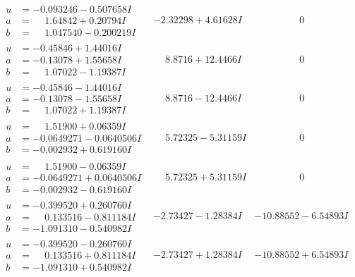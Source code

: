 \documentclass[1p]{elsarticle_modified}
\theoremstyle{definition}
\begin{document}
$$\begin{array}{c|c|c}
\begin{aligned}
u &= -0.093246 - 0.507658 I \\
a &= \phantom{-}1.64842 + 0.20794 I \\
b &= \phantom{-}1.047540 - 0.200219 I\end{aligned}
 & -2.32298 + 4.61628 I & \phantom{-0.000000 } 0 \\ \hline\begin{aligned}
u &= -0.45846 + 1.44016 I \\
a &= -0.13078 + 1.55658 I \\
b &= \phantom{-}1.07022 - 1.19387 I\end{aligned}
 & \phantom{-}8.8716 + 12.4466 I & \phantom{-0.000000 } 0 \\ \hline\begin{aligned}
u &= -0.45846 - 1.44016 I \\
a &= -0.13078 - 1.55658 I \\
b &= \phantom{-}1.07022 + 1.19387 I\end{aligned}
 & \phantom{-}8.8716 - 12.4466 I & \phantom{-0.000000 } 0 \\ \hline\begin{aligned}
u &= \phantom{-}1.51900 + 0.06359 I \\
a &= -0.0649271 - 0.0640506 I \\
b &= -0.002932 + 0.619160 I\end{aligned}
 & \phantom{-}5.72325 - 5.31159 I & \phantom{-0.000000 } 0 \\ \hline\begin{aligned}
u &= \phantom{-}1.51900 - 0.06359 I \\
a &= -0.0649271 + 0.0640506 I \\
b &= -0.002932 - 0.619160 I\end{aligned}
 & \phantom{-}5.72325 + 5.31159 I & \phantom{-0.000000 } 0 \\ \hline\begin{aligned}
u &= -0.399520 + 0.260760 I \\
a &= \phantom{-}0.133516 - 0.811184 I \\
b &= -1.091310 - 0.540982 I\end{aligned}
 & -2.73427 - 1.28384 I & -10.88552 - 6.54893 I \\ \hline\begin{aligned}
u &= -0.399520 - 0.260760 I \\
a &= \phantom{-}0.133516 + 0.811184 I \\
b &= -1.091310 + 0.540982 I\end{aligned}
 & -2.73427 + 1.28384 I & -10.88552 + 6.54893 I \\ \hline\begin{aligned}

\end{aligned}
\end{array}$$
\end{document}
